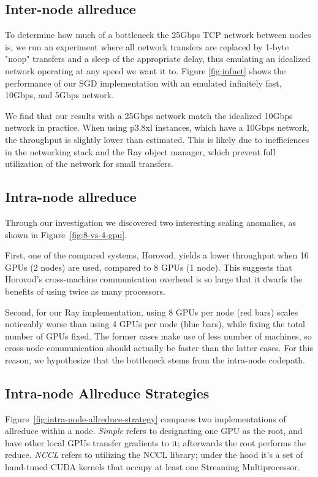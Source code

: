 \subsection{Inter-node allreduce}
To determine how much of a bottleneck the 25Gbps TCP network between nodes is, we run an experiment where all network transfers are replaced by 1-byte "noop" transfers and a sleep of the appropriate delay, thus emulating an idealized network operating at any speed we want it to. Figure \ref{fig:infnet} shows the performance of our SGD implementation with an emulated infinitely fast, 10Gbps, and 5Gbps network.

We find that our results with a 25Gbps network match the idealized 10Gbps network in practice. When using p3.8xl instances, which have a 10Gbps network, the throughput is slightly lower than estimated. This is likely due to inefficiences in the networking stack and the Ray object manager, which prevent full utilization of the network for small transfers.

\subsection{Intra-node allreduce}
Through our investigation we discovered two interesting scaling anomalies, as
shown in Figure~\ref{fig:8-vs-4-gpu}.

First, one of the compared systems, Horovod, yields a lower throughput when 16
GPUs (2 nodes) are used, compared to 8 GPUs (1 node).  This suggests that
Horovod's cross-machine communication overhead is so large that it dwarfs the
benefits of using twice as many processors.

Second, for our Ray implementation, using 8 GPUs per node (red bars) scales
noticeably worse than using 4 GPUs per node (blue bars), while fixing the total
number of GPUs fixed.  The former cases make use of less number of machines, so
cross-node communication should actually be faster than the latter cases.  For
this reason, we hypothesize that the bottleneck stems from the intra-node
codepath.

\subsection{Intra-node Allreduce Strategies}
Figure~\ref{fig:intra-node-allreduce-strategy} compares two implementations of
allreduce within a node.  \emph{Simple} refers to designating one GPU as the
root, and have other local GPUs transfer gradients to it; afterwards the root
performs the reduce.  \emph{NCCL} refers to utilizing the NCCL library; under
the hood it's a set of hand-tuned CUDA kernels that occupy at least one
Streaming Multiprocessor.

